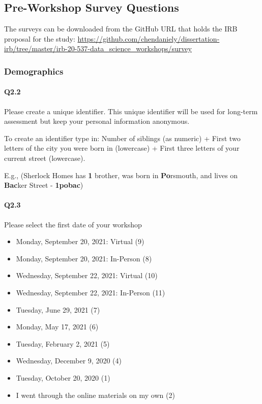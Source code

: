 \documentclass[030-workshop.tex]{subfiles}
\begin{document}
\subsection{Pre-Workshop Survey Questions}
\label{sse:preworkshop-survey-questions}

The surveys can be downloaded from the GitHub URL that holds the IRB proposal for the study:
\url{https://github.com/chendaniely/dissertation-irb/tree/master/irb-20-537-data\_science_workshops/survey}

\subsubsection{Demographics}

\paragraph{Q2.2}

    Please create a unique identifier.
    This unique identifier will be used for long-term assessment but keep your personal information anonymous.

    To create an identifier type in:
    Number of siblings (as numeric) +
    First two letters of the city you were born in (lowercase) +
    First three letters of your current street (lowercase).

    E.g., (Sherlock Homes has \textbf{1} brother,
        was born in \textbf{Po}rsmouth,
        and lives on \textbf{Bac}ker Street - \textbf{1pobac})

\paragraph{Q2.3}

    Please select the first date of your workshop

    \begin{itemize}
        \item Monday, September 20, 2021: Virtual  (9)
        \item Monday, September 20, 2021: In-Person  (8)
        \item Wednesday, September 22, 2021: Virtual  (10)
        \item Wednesday, September 22, 2021: In-Person  (11)
        \item Tuesday, June 29, 2021  (7)
        \item Monday, May 17, 2021  (6)
        \item Tuesday, February 2, 2021  (5)
        \item Wednesday, December 9, 2020  (4)
        \item Tuesday, October 20, 2020  (1)
        \item I went through the online materials on my own  (2)
    \end{itemize}
\end{document}
